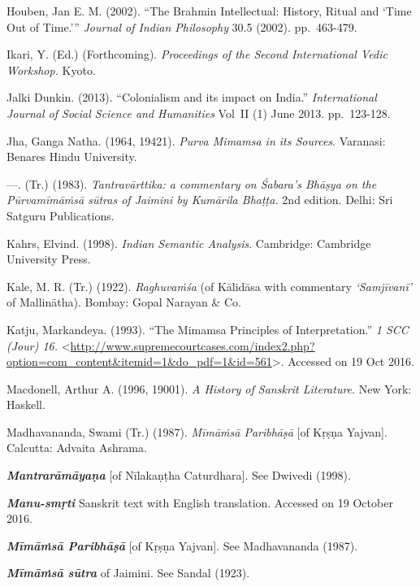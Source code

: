 \begin{thebibliography}{99}
  Houben, Jan E. M. (2002). “The Brahmin Intellectual: History, Ritual and ‘Time Out of Time.’” \textit{Journal of Indian Philosophy} 30.5 (2002). pp.~463-479.

  Ikari, Y. (Ed.) (Forthcoming). \textit{Proceedings of the Second International Vedic Workshop.} Kyoto.

  Jalki Dunkin. (2013). “Colonialism and its impact on India.” \textit{International Journal of Social Science and Humanities} Vol~II (1) June 2013. pp.~123-128.

  Jha, Ganga Natha. (1964, 19421). \textit{Purva Mimamsa in its Sources}. Varanasi: Benares Hindu University.

  —. (Tr.) (1983). \textit{Tantravārttika: a commentary on Śabara's Bhāṣya on the Pūrvamīmāṁsā sūtras of Jaimini by Kumārila Bhaṭṭa.} 2nd edition. Delhi: Sri Satguru Publications.

  Kahrs, Elvind. (1998). \textit{Indian Semantic Analysis}. Cambridge: Cambridge University Press.

  Kale, M. R. (Tr.) (1922). \textit{Raghuvaṁśa} (of Kālidāsa with commentary \textit{‘Samjīvanī’} of Mallinātha). Bombay: Gopal Narayan \& Co.

  Katju, Markandeya. (1993). “The Mimamsa Principles of Interpretation.” \textit{1 SCC (Jour) 16.} \textless  \url{http://www.supremecourtcases.com/index2.php?option=com_content&itemid=1&do_pdf=1&id=561}\textgreater . Accessed on 19 Oct 2016.

  Macdonell, Arthur A. (1996, 19001). \textit{A History of Sanskrit Literature}. New York: Haskell.  

  Madhavananda, Swami (Tr.) (1987). \textit{Mīmāṁsā Paribhāṣā} [of Kṛṣṇa Yajvan]. Calcutta: Advaita Ashrama.

  \textbf{\textit{Mantrarāmāyaṇa}} [of Nīlakaṇṭha Caturdhara]. See Dwivedi (1998).

  \textbf{\textit{Manu-smṛti}} Sanskrit text with English translation. Accessed on 19 October 2016.

  \textbf{\textit{Mīmāṁsā Paribhāṣā}} [of Kṛṣṇa Yajvan]. See Madhavananda (1987).

  \textbf{\textit{Mīmāṁsā sūtra}} of Jaimini. See Sandal (1923).


\end{thebibliography}
